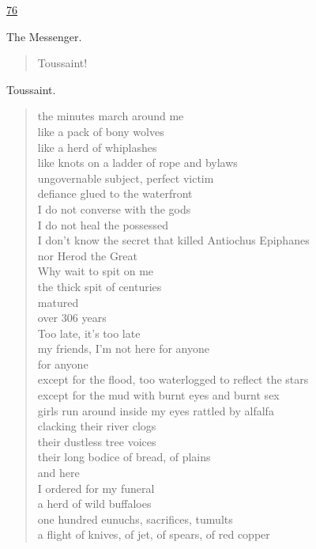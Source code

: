 \documentclass[letterpaper,article,12pt,oneside,notitlepage]{memoir}
\begin{document}
\href{http://cesaire.elotroalex.com/chiens/chiens/p076.html}{76}

\begin{center}The Messenger.\end{center}

\begin{verse}
Toussaint! \\
\end{verse}

\begin{center}Toussaint.\end{center}

\begin{verse}
the minutes march around me \\
like a pack of bony wolves \\
like a herd of whiplashes \\
like knots on a ladder of rope and bylaws \\
ungovernable subject, perfect victim \\
defiance glued to the waterfront \\
I do not converse with the gods \\
I do not heal the possessed \\
I don't know the secret that killed Antiochus Epiphanes \\
nor Herod the Great \\
Why wait to spit on me \\
the thick spit of centuries \\
matured \\
over 306 years \\
Too late, it's too late \\
my friends, I'm not here for anyone \\
for anyone \\
except for the flood, too waterlogged to reflect the stars \\
except for the mud with burnt eyes and burnt sex \\
girls run around inside my eyes rattled by alfalfa \\
clacking their river clogs \\
their dustless tree voices \\
their long bodice of bread, of plains \\
and here \\
I ordered for my funeral \\
a herd of wild buffaloes \\
one hundred eunuchs, sacrifices, tumults \\
a flight of knives, of jet, of spears, of red copper \\
\end{verse}
\end{document}
